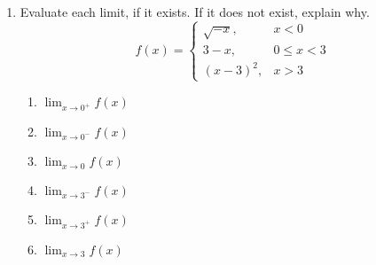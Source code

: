 \begin{enumerate}
\item Evaluate each limit, if it exists. If it does not exist, explain why.
\[
f(x) = \left\{
\begin{matrix}
\sqrt{-x}, & x<0\\
3-x, & 0\leq x <3\\
(x-3)^2, & x>3
\end{matrix}
\right.
\]

\begin{enumerate}
\item \(\displaystyle \lim_{x\rightarrow 0^+} f(x)\)
\item \(\displaystyle \lim_{x\rightarrow 0^-} f(x)\)
\item \(\displaystyle \lim_{x\rightarrow 0} f(x)\)
\item \(\displaystyle \lim_{x\rightarrow 3^-} f(x)\)
\item \(\displaystyle \lim_{x\rightarrow 3^+} f(x)\)
\item \(\displaystyle \lim_{x\rightarrow 3} f(x)\)

\end{enumerate}

\end{enumerate}




\label{lastpage}

